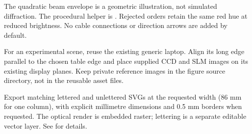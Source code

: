 \documentclass[11pt,a4paper]{article}
\begin{document}
The quadratic beam envelope is a geometric illustration, not simulated diffraction. The procedural helper is . Rejected orders retain the same red hue at reduced brightness. No cable connections or direction arrows are added by default.

For an experimental scene, reuse the existing generic laptop. Align its long edge parallel to the chosen table edge and place supplied CCD and SLM images on its existing display planes. Keep private reference images in the figure source directory, not in the reusable asset files.

Export matching lettered and unlettered SVGs at the requested width (86 mm for one column), with explicit millimetre dimensions and 0.5 mm borders when requested. The optical render is embedded raster; lettering is a separate editable vector layer. See  for details.
\end{document}
